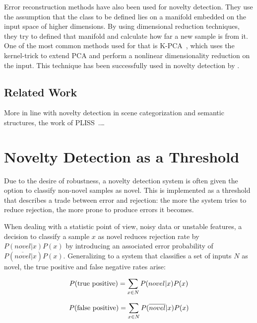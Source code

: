 Error reconstruction methods have also been used for novelty detection.
They use the assumption that the class to be defined lies on a manifold embedded
on the input space of higher dimensions. By using dimensional reduction
techniques, they try to defined that manifold and calculate how far a new sample
is from it.
One of the most common methods used for that is
\gls{K-PCA}~\cite{scholkopf1997kernel}, which uses the kernel-trick to extend
\gls{PCA} and perform a nonlinear dimensionality reduction on the input.
This technique has been successfully used in novelty detection by
\cite{Hoffmann2007863}.

\subsection{Related Work}
More in line with novelty detection in scene categorization and semantic
structures, the work of \gls{PLISS}~\cite{ranganathan2010pliss}.\dots 



\section{Novelty Detection as a Threshold}

Due to the desire of robustness, a novelty detection system is often given the option
to classify non-novel samples as novel. This is implemented as a threshold that describes a trade
between error and rejection: the more the system tries to reduce rejection, the more
prone to produce errors it becomes.

When dealing with a statistic point of view, noisy data or unstable features,
a decision to classify a sample $x$ as novel reduces rejection rate by
$P(novel|x)P(x)$ by introducing an associated error probability of $P(\overline{novel}|x)P(x)$.
Generalizing to a system that classifies a set of inputs $N$ as novel, the
true positive and false negative rates arise:

\begin{equation}
\label{eq:true-positive}
P(\textnormal{true positive}) = \sum_{x \in N}{P(novel|x)P(x)}
\end{equation}

\begin{equation}
\label{eq:false-positive}
P(\textnormal{false positive}) = \sum_{x \in N}{P(\overline{novel}|x)P(x)}
\end{equation}

